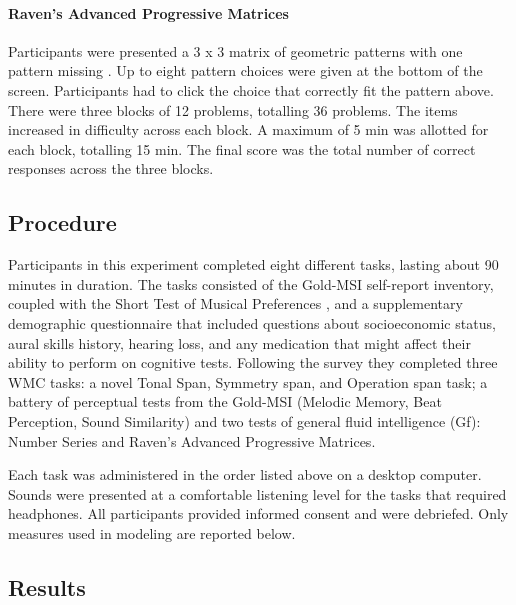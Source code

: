 \documentclass[12pt,]{book}
\let\oldparagraph\paragraph
\renewcommand{\paragraph}[1]{\oldparagraph{#1}\mbox{}}
\begin{document}
\hypertarget{ravens-advanced-progressive-matrices}{%
\paragraph{Raven's Advanced Progressive Matrices}\label{ravens-advanced-progressive-matrices}}

Participants were presented a 3 x 3 matrix of geometric patterns with one pattern missing \citep{ravenManualRavenProgressive1994}. Up to eight pattern choices were given at the bottom of the screen.
Participants had to click the choice that correctly fit the pattern above.
There were three blocks of 12 problems, totalling 36 problems.
The items increased in difficulty across each block.
A maximum of 5 min was allotted for each block, totalling 15 min.
The final score was the total number of correct responses across the three blocks.

\hypertarget{procedure}{%
\subsection{Procedure}\label{procedure}}

Participants in this experiment completed eight different tasks, lasting about 90 minutes in duration.
The tasks consisted of the Gold-MSI self-report inventory, coupled with the Short Test of Musical Preferences \citep{rentfrowReMiEveryday2003}, and a supplementary demographic questionnaire that included questions about socioeconomic status, aural skills history, hearing loss, and any medication that might affect their ability to perform on cognitive tests.
Following the survey they completed three WMC tasks: a novel Tonal Span, Symmetry span, and Operation span task; a battery of perceptual tests from the Gold-MSI (Melodic Memory, Beat Perception, Sound Similarity) and two tests of general fluid intelligence (Gf): Number Series and Raven's Advanced Progressive Matrices.

Each task was administered in the order listed above on a desktop computer.
Sounds were presented at a comfortable listening level for the tasks that required headphones.
All participants provided informed consent and were debriefed.
Only measures used in modeling are reported below.

\hypertarget{results}{%
\subsection{Results}\label{results}}
\end{document}

